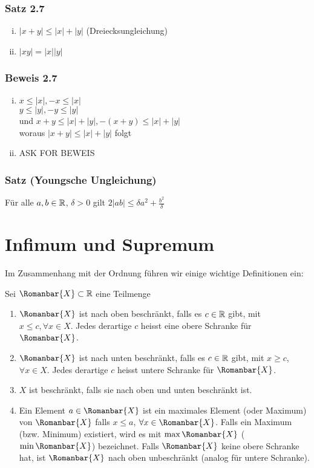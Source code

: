 \begin{enumerate}
\subsubsection*{Satz 2.7}
\begin{enumerate}[i)]
\item $\left| {x + y} \right| \le \left| x \right| + \left| y \right|$ (Dreiecksungleichung)
\item $\left| {xy} \right| = \left| x \right|\left| y \right|$
\end{enumerate}
\subsubsection*{Beweis 2.7}
\begin{enumerate}[i)]
\item $x \le \left| x \right|, - x \le \left| x \right|$\\$y \le \left| y \right|, - y \le \left| y \right|$\\und $x+y\leq  \left| x \right| +  \left| y \right|, - (x + y) \le \left| x \right| + \left| y \right|$ \\ woraus $\left| {x + y} \right| \le \left| x \right| + \left| y \right|$ folgt
\item ASK FOR BEWEIS
\end{enumerate}

\subsubsection*{Satz (Youngsche Ungleichung)}
Für alle $a,b\in\mathbb{R}$, $\delta >0$ gilt $2\left| {ab} \right| \le \delta {a^2} + \frac{{{b^2}}}{\delta }$
\end{enumerate}

\section{Infimum und Supremum}
Im Zusammenhang mit der Ordnung führen wir einige wichtige Definitionen ein:

\begin{definition}{2.8}
Sei $\Romanbar{X}\subset\R$ eine Teilmenge
\begin{enumerate}[\indent a)]
\item $\Romanbar{X}$ ist nach oben beschränkt, falls es $c\in\mathbb{R}$ gibt, mit $x\leq c, \forall x\in X$. Jedes derartige $c$ heisst eine obere Schranke für $\Romanbar{X}$.
\item $\Romanbar{X}$ ist nach unten beschränkt, falls es $c\in\mathbb{R}$ gibt, mit $x\geq c$, $\forall x\in X$. Jedes derartige $c$ heisst untere Schranke für $\Romanbar{X}$.
\item $X$ ist beschränkt, falls sie nach oben und unten beschränkt ist.
\item Ein Element $a\in\Romanbar{X}$ ist ein maximales Element (oder Maximum) von $\Romanbar{X}$ falls $x\leq a$, $\forall x\in\Romanbar{X}$. Falls ein Maximum (bzw. Minimum) existiert, wird es mit $\max\Romanbar{X}$ ($\min\Romanbar{X}$) bezeichnet. Falls $\Romanbar{X}$ keine obere Schranke hat, ist $\Romanbar{X}$ nach oben unbeschränkt (analog für untere Schranke).
\end{enumerate}
\end{definition}
